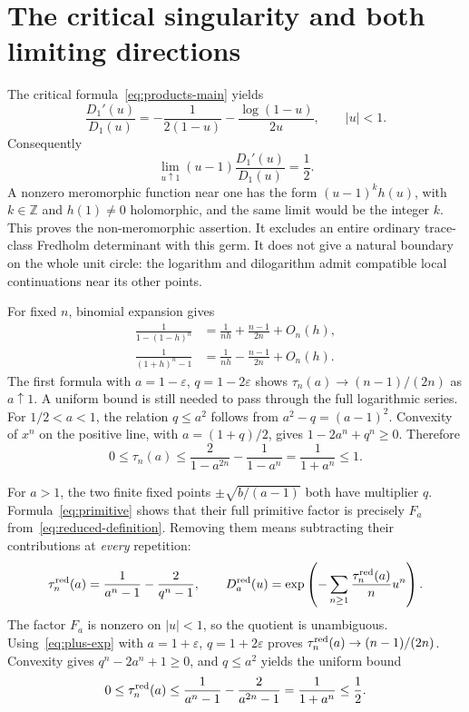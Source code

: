 \section{The critical singularity and both limiting directions}\label{sec:critical}

The critical formula~\eqref{eq:products-main} yields
\begin{equation}\label{eq:log-derivative}
 \frac{D_1'(u)}{D_1(u)}=-\frac1{2(1-u)}-\frac{\log(1-u)}{2u},
 \qquad |u|<1.
\end{equation}
Consequently
\begin{equation}\label{eq:fractional-order}
 \lim_{u\uparrow1}(u-1)\frac{D_1'(u)}{D_1(u)}=\frac12.
\end{equation}
A nonzero meromorphic function near one has the form $(u-1)^k h(u)$, with
$k\in\mathbb Z$ and $h(1)\ne0$ holomorphic, and the same limit would be the
integer $k$. This proves the non-meromorphic assertion. It excludes an entire
ordinary trace-class Fredholm determinant with this germ. It does not give a
natural boundary on the whole unit circle: the logarithm and dilogarithm admit
compatible local continuations near its other points.

For fixed $n$, binomial expansion gives
\begin{align}
 \frac1{1-(1-h)^n}&=\frac1{nh}+\frac{n-1}{2n}+O_n(h),\label{eq:minus-exp}\\
 \frac1{(1+h)^n-1}&=\frac1{nh}-\frac{n-1}{2n}+O_n(h).\label{eq:plus-exp}
\end{align}
The first formula with $a=1-\varepsilon$, $q=1-2\varepsilon$ shows
$\tau_n(a)\to(n-1)/(2n)$ as $a\uparrow1$. A uniform bound is still needed to
pass through the full logarithmic series. For $1/2<a<1$, the relation
$q\le a^2$ follows from $a^2-q=(a-1)^2$. Convexity of $x^n$ on the positive
line, with $a=(1+q)/2$, gives $1-2a^n+q^n\ge0$. Therefore
\begin{equation}\label{eq:uniform-minus}
 0\le\tau_n(a)
 \le\frac2{1-a^{2n}}-\frac1{1-a^n}
 =\frac1{1+a^n}\le1.
\end{equation}

For $a>1$, the two finite fixed points $\pm\sqrt{b/(a-1)}$ both have
multiplier $q$. Formula~\eqref{eq:primitive} shows that their full primitive
factor is precisely $F_a$ from~\eqref{eq:reduced-definition}. Removing them
means subtracting their contributions at \emph{every} repetition:
\begin{equation}\label{eq:reduced-tau}
 \tau_n^{\mathrm{red}}(a)=\frac1{a^n-1}-\frac2{q^n-1},\qquad
 D_a^{\mathrm{red}}(u)=\exp\left(-\sum_{n\ge1}\frac{\tau_n^{\mathrm{red}}(a)}n u^n\right).
\end{equation}
The factor $F_a$ is nonzero on $|u|<1$, so the quotient is unambiguous.
Using~\eqref{eq:plus-exp} with $a=1+\varepsilon$, $q=1+2\varepsilon$ proves
$\tau_n^{\mathrm{red}}(a)\to(n-1)/(2n)$. Convexity gives
$q^n-2a^n+1\ge0$, and $q\le a^2$ yields the uniform bound
\begin{equation}\label{eq:uniform-plus}
 0\le\tau_n^{\mathrm{red}}(a)
 \le\frac1{a^n-1}-\frac2{a^{2n}-1}
 =\frac1{1+a^n}\le\frac12.
\end{equation}

